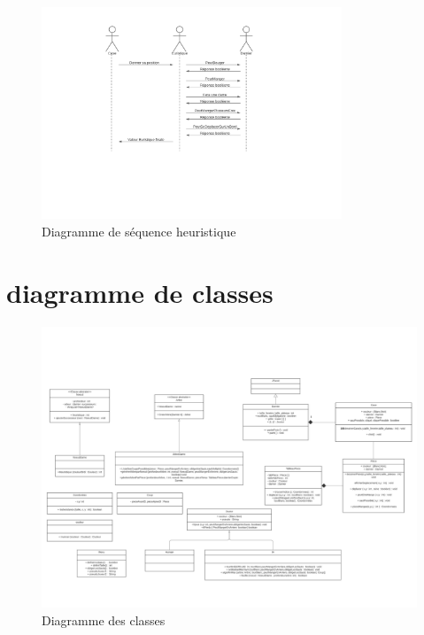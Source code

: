 \documentclass[12,french]{report}
\begin{document}
\begin{figure}[H]
	\center
	\includegraphics[width=0.8\textwidth]{./Images/Diagramme_de_sequence2}
	\caption{Diagramme de séquence heuristique}
\end{figure}\vspace{0.2cm}

\section{diagramme de classes}

\begin{figure}[H]
	\center
	\includegraphics[width=1\textwidth]{./Images/Diagramme_classe}
	\caption{Diagramme des classes}
\end{figure}\vspace{0.2cm}

\end{document}
